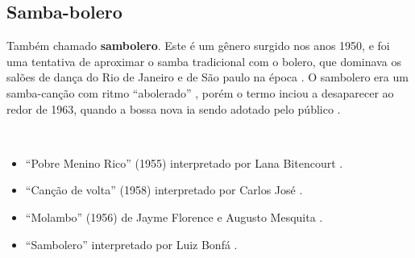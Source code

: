 \subsection{Samba-bolero}
Também chamado \textbf{sambolero}.
Este é um gênero surgido nos anos 1950, e foi uma tentativa de aproximar o samba tradicional com o bolero,
que dominava os salões de dança do Rio de Janeiro e de São paulo na época \cite[pp. 291]{dourado2004dicionario}.
O sambolero era um samba-canção com ritmo ``abolerado'' \cite[pp. 685]{marcondes1977enciclopediav2},
porém o termo inciou a desaparecer ao redor de 1963, 
quando a bossa nova ia sendo adotado pelo público \cite[pp. 84]{biblioteca2006cultura}.

\begin{example} ~

\begin{itemize}
\item ``Pobre Menino Rico'' (1955) interpretado  por Lana Bitencourt \cite[pp. 5]{pobremeninorico}.
\item ``Canção de volta'' (1958) interpretado por Carlos José \cite[pp. 36]{carlosjosemsuica}.
\item ``Molambo'' (1956) de Jayme Florence e Augusto Mesquita \cite[pp. 481, 516]{faour2001bastidores}.
\item ``Sambolero'' interpretado por Luiz Bonfá \cite[pp. 49]{sambolero}.
\end{itemize}
\end{example}


